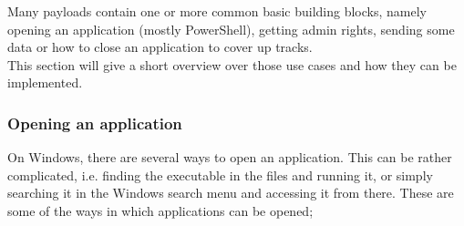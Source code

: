 Many payloads contain one or more common basic building blocks, namely opening an application (mostly PowerShell), getting admin rights, sending some data or how to close an application to cover up tracks.  \\
This section will give a short overview over those use cases and how they can be implemented.


\subsubsection{Opening an application}

On Windows, there are several ways to open an application. This can be rather complicated, i.e. finding the executable in the files and running it, or simply searching it in the Windows search menu and accessing it from there. These are some of the ways in which applications can be opened;
